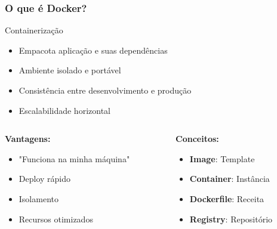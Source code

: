 \documentclass[aspectratio=169]{beamer}
\begin{document}
\begin{frame}
    \frametitle{O que é Docker?}
    \begin{block}{Containerização}
        \begin{itemize}
            \item Empacota aplicação e suas dependências
            \item Ambiente isolado e portável
            \item Consistência entre desenvolvimento e produção
            \item Escalabilidade horizontal
        \end{itemize}
    \end{block}
    
    \begin{columns}
        \begin{column}{0.5\textwidth}
            \textbf{Vantagens:}
            \begin{itemize}
                \item "Funciona na minha máquina"
                \item Deploy rápido
                \item Isolamento
                \item Recursos otimizados
            \end{itemize}
        \end{column}
        \begin{column}{0.5\textwidth}
            \textbf{Conceitos:}
            \begin{itemize}
                \item \textbf{Image}: Template
                \item \textbf{Container}: Instância
                \item \textbf{Dockerfile}: Receita
                \item \textbf{Registry}: Repositório
            \end{itemize}
        \end{column}
    \end{columns}
\end{frame}
\end{document}
